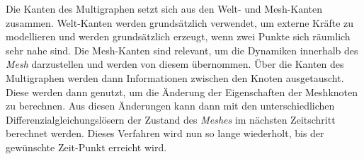 Die Kanten des Multigraphen setzt sich aus den Welt- und Mesh-Kanten zusammen.
Welt-Kanten werden grundsätzlich verwendet, um externe Kräfte zu modellieren und werden grundsätzlich erzeugt, 
wenn zwei Punkte sich räumlich sehr nahe sind.
Die Mesh-Kanten sind relevant, um die Dynamiken innerhalb des \textit{Mesh} darzustellen und werden von diesem übernommen.
Über die Kanten des Multigraphen werden dann Informationen zwischen den Knoten ausgetauscht.
Diese werden dann genutzt, um die Änderung der Eigenschaften der Meshknoten zu berechnen.
Aus diesen Änderungen kann dann mit den unterschiedlichen Differenzialgleichungslösern der Zustand des \textit{Meshes} im nächsten Zeitschritt berechnet werden. 
Dieses Verfahren wird nun so lange wiederholt, bis der gewünschte Zeit-Punkt erreicht wird.








